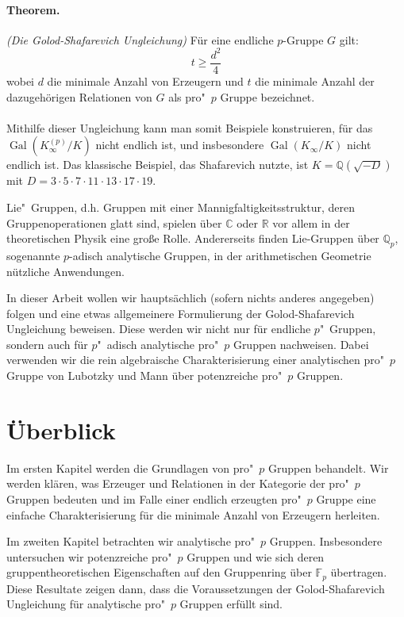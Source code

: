 \documentclass[11pt,a4paper,openany]{memoir}
\begin{document}
\paragraph{Theorem.} \textit{(Die Golod-Shafarevich Ungleichung)} Für eine endliche $p$-Gruppe $G$ gilt:
\[ t\geq \frac{d^2}{4} \]
wobei $d$ die minimale Anzahl von Erzeugern und $t$ die minimale Anzahl der dazugehörigen Relationen von $G$ als pro"~$p$ Gruppe bezeichnet.

\paragraph{} Mithilfe dieser Ungleichung kann man somit Beispiele konstruieren, für das $\operatorname{Gal}(K_\infty^{(p)}/K)$ nicht endlich ist, und insbesondere $\operatorname{Gal}(K_\infty/K)$ nicht endlich ist. Das klassische Beispiel, das Shafarevich nutzte, ist $K=\mathbb{Q}(\sqrt{-D})$ mit $D=3\cdot 5\cdot 7\cdot 11\cdot 13\cdot 17\cdot 19$. 

Lie"~Gruppen, d.h. Gruppen mit einer Mannigfaltigkeitsstruktur, deren Grup\-pen\-ope\-ra\-tio\-nen glatt sind, spielen über  $\mathbb{C}$ oder $\mathbb{R}$ vor allem in der theoretischen Physik eine große Rolle. Andererseits finden Lie-Gruppen über $\mathbb{Q}_p$, sogenannte $p$-adisch analytische Gruppen, in der arithmetischen Geometrie nützliche Anwendungen. 

In dieser Arbeit wollen wir hauptsächlich (sofern nichts anderes angegeben) \cite{DDMS99} folgen und eine etwas allgemeinere Formulierung der Golod-Shafarevich Ungleichung beweisen. Diese werden wir nicht nur für endliche $p$"~Gruppen, sondern auch für $p$"~adisch analytische pro"~$p$ Gruppen nachweisen. Dabei verwenden wir die rein algebraische Charakterisierung einer analytischen pro"~$p$ Gruppe von Lubotzky und Mann \cite{LM87} über potenzreiche pro"~$p$ Gruppen.

\section{Überblick}

Im ersten Kapitel werden die Grundlagen von pro"~$p$ Gruppen behandelt. Wir werden klären, was Erzeuger und Relationen in der Kategorie der pro"~$p$ Gruppen bedeuten und im Falle einer endlich erzeugten pro"~$p$ Gruppe eine einfache Charakterisierung für die minimale Anzahl von Erzeugern herleiten.

Im zweiten Kapitel betrachten wir analytische pro"~$p$ Gruppen. Insbesondere untersuchen wir potenzreiche pro"~$p$ Gruppen und wie sich deren gruppentheoretischen Eigenschaften auf den Gruppenring über $\mathbb{F}_p$ übertragen. Diese Resultate zeigen dann, dass die Voraussetzungen der Golod-Shafarevich Ungleichung für analytische pro"~$p$ Gruppen erfüllt sind.
\end{document}
